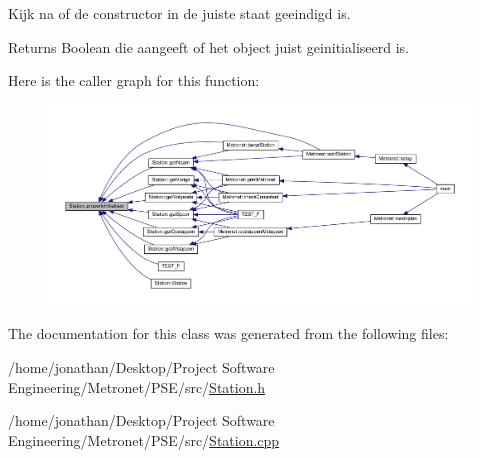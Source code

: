 Kijk na of de constructor in de juiste staat geeindigd is. 

\begin{DoxyReturn}{Returns}
Boolean die aangeeft of het object juist geinitialiseerd is. 
\end{DoxyReturn}


Here is the caller graph for this function\+:
\nopagebreak
\begin{figure}[H]
\begin{center}
\leavevmode
\includegraphics[width=350pt]{class_station_a5749af84d13b71d34aa1fb5b0a935a20_icgraph}
\end{center}
\end{figure}




The documentation for this class was generated from the following files\+:\begin{DoxyCompactItemize}
\item 
/home/jonathan/\+Desktop/\+Project Software Engineering/\+Metronet/\+P\+S\+E/src/\hyperlink{_station_8h}{Station.\+h}\item 
/home/jonathan/\+Desktop/\+Project Software Engineering/\+Metronet/\+P\+S\+E/src/\hyperlink{_station_8cpp}{Station.\+cpp}\end{DoxyCompactItemize}
